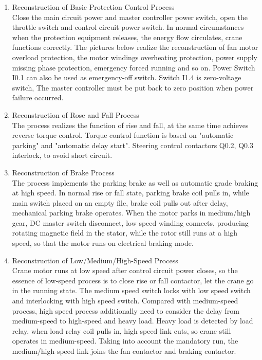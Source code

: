 \documentclass[a4paper,13pt]{article}
\begin{document}
\begin{enumerate} %
\item Reconstruction of Basic Protection Control Process\\
Close the main circuit power and master controller power switch, open the throttle switch and control circuit power switch. In normal circumstances when the protection equipment releases, the energy flow circulates, crane functions correctly. The pictures below realize the reconstruction of fan motor overload protection, the motor windings overheating protection, power supply missing phase protection, emergency forced running and so on. Power Switch I0.1 can also be used as emergency-off switch. Switch I1.4 is zero-voltage switch, The master controller must be put back to zero position when power failure occurred. \\
\item Reconstruction of Rose and Fall Process \\
The process realizes the function of rise and fall, at the same time achieves reverse torque control. Torque control function is based on "automatic parking" and "automatic delay start". Steering control contactors Q0.2, Q0.3 interlock, to avoid short circuit. 
\item Reconstruction of Brake Process \\
The process implements the parking brake as well as automatic grade braking at high speed. In normal rise or fall state, parking brake coil pulls in, while main switch placed on an empty file, brake coil pulls out after delay, mechanical parking brake operates. When the motor parks in medium/high gear, DC master switch disconnect, low speed winding connects, producing rotating magnetic field in the stator, while the rotor still runs at a high speed, so that the motor runs on electrical braking mode.
\item Reconstruction of Low/Medium/High-Speed Process \\
Crane motor runs at low speed after control circuit power closes, so the essence of low-speed process is to close rise or fall contactor, let the crane go in the running state. The medium speed switch locks with low speed switch and interlocking with high speed switch. Compared with medium-speed process, high speed process additionally need to consider the delay from medium-speed to high-speed and heavy load. Heavy load is detected by load relay, when load relay coil pulls in, high speed link cuts, so crane still operates in medium-speed. Taking into account the mandatory run, the medium/high-speed link joins the fan contactor and braking contactor. \\

\end{enumerate}
\end{document}
